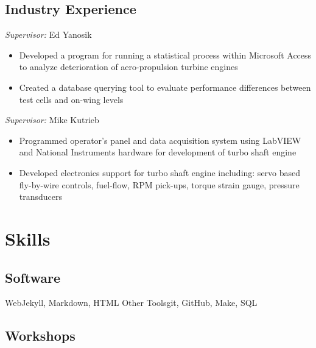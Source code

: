 \documentclass[11pt,letter,sans]{moderncv}
\begin{document}
\subsection{Industry Experience}

%
  {\textit{Supervisor:} Ed Yanosik
  \begin{itemize}
  	\item Developed a program for running a statistical process within Microsoft Access to analyze deterioration of aero-propulsion turbine engines
	\item Created a database querying tool to evaluate performance differences between test cells and on-wing levels
  \end{itemize}
  }

%
  {\textit{Supervisor:} Mike Kutrieb
  \begin{itemize}
  	\item Programmed operator's panel and data acquisition system using LabVIEW and National Instruments hardware for development of turbo shaft engine
	\item Developed electronics support for turbo shaft engine including: servo based fly-by-wire controls, fuel-flow, RPM pick-ups, torque strain gauge, pressure transducers
  \end{itemize}
  }

\section{Skills}

\subsection{Software}

           {Web}{Jekyll, Markdown, HTML}
           {Other Tools}{git, GitHub, Make, SQL}

\subsection{Workshops}

\end{document}
